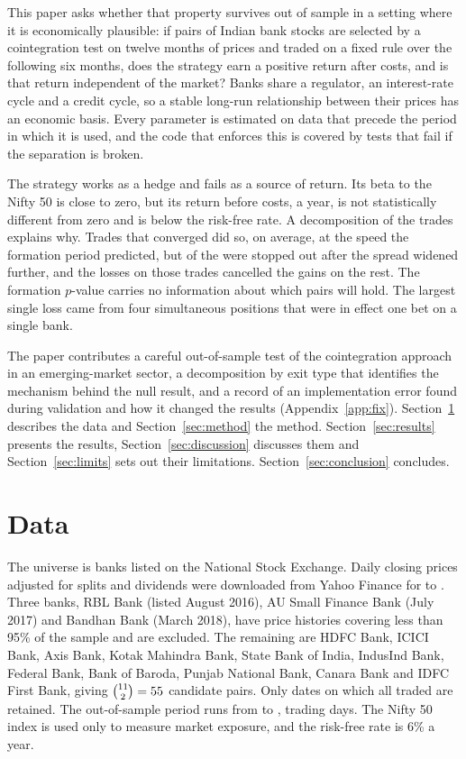 \documentclass[11pt]{article}
\begin{document}
This paper asks whether that property survives out of sample in a setting where it
is economically plausible: if pairs of Indian bank stocks are selected by a
cointegration test on twelve months of prices and traded on a fixed rule over the
following six months, does the strategy earn a positive return after costs, and is
that return independent of the market? Banks share a regulator, an interest-rate
cycle and a credit cycle, so a stable long-run relationship between their prices
has an economic basis. Every parameter is estimated on data that precede the
period in which it is used, and the code that enforces this is covered by tests
that fail if the separation is broken.

The strategy works as a hedge and fails as a source of return. Its beta to the
Nifty 50 is close to zero, but its return before costs, \RetG{} a year, is not
statistically different from zero and is below the risk-free rate. A decomposition
of the \NTrades{} trades explains why. Trades that converged did so, on average, at
the speed the formation period predicted, but \NStop{} of the \NTrades{} were
stopped out after the spread widened further, and the losses on those trades
cancelled the gains on the rest. The formation $p$-value carries no information
about which pairs will hold. The largest single loss came from four simultaneous
positions that were in effect one bet on a single bank.

The paper contributes a careful out-of-sample test of the cointegration approach in
an emerging-market sector, a decomposition by exit type that identifies the
mechanism behind the null result, and a record of an implementation error found
during validation and how it changed the results (Appendix~\ref{app:fix}).
Section~\ref{sec:data} describes the data and Section~\ref{sec:method} the method.
Section~\ref{sec:results} presents the results, Section~\ref{sec:discussion}
discusses them and Section~\ref{sec:limits} sets out their limitations.
Section~\ref{sec:conclusion} concludes.

\section{Data}\label{sec:data}

The universe is \NUniverse{} banks listed on the National Stock Exchange. Daily
closing prices adjusted for splits and dividends were downloaded from Yahoo
Finance for \SampleStart{} to \SampleEnd. Three banks, RBL Bank (listed August
2016), AU Small Finance Bank (July 2017) and Bandhan Bank (March 2018), have price
histories covering less than 95\% of the sample and are excluded. The remaining
\NTraded{} are HDFC Bank, ICICI Bank, Axis Bank, Kotak Mahindra Bank, State Bank of
India, IndusInd Bank, Federal Bank, Bank of Baroda, Punjab National Bank, Canara
Bank and IDFC First Bank, giving $\binom{11}{2} = 55$ candidate pairs. Only
dates on which all \NTraded{} traded are retained. The out-of-sample period runs
from \OOSStart{} to \OOSEnd, \OOSDays{} trading days. The Nifty 50 index is used only
to measure market exposure, and the risk-free rate is 6\% a year.
\end{document}
